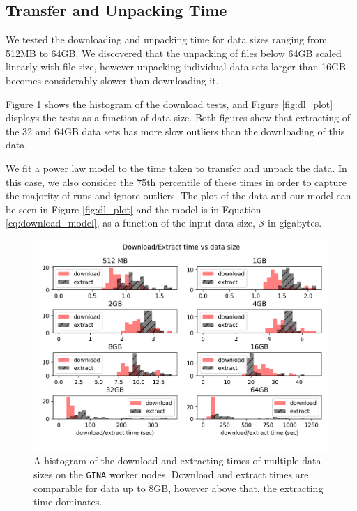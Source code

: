 \subsection{Transfer and Unpacking Time}\label{sec:results_dl}

We tested the downloading and unpacking time for data sizes ranging from 512MB to 64GB. We discovered that the unpacking of files below 64GB scaled linearly with file size, however unpacking individual data sets larger than 16GB becomes considerably slower than downloading it. 

Figure \ref{fig:dl_hist} shows the histogram of the download tests, and Figure \ref{fig:dl_plot} displays the tests as a function of data size. Both figures show that extracting of the 32 and 64GB data sets has more slow outliers than the downloading of this data. 

We fit a power law model to the time taken to transfer and unpack the data. In this case, we also consider the 75th percentile of these times in order to capture the majority of runs and ignore outliers. The plot of the data and our model can be seen in Figure \ref{fig:dl_plot} and the model is in Equation \ref{eq:download_model}, as a function of the input data size,
$\mathcal{S} $ in gigabytes.

\begin{figure}
    \includegraphics[width=0.95\linewidth]{figures/dl_ex_hatched.png}
      \caption{A histogram of the download and extracting times of multiple data sizes on the \texttt{GINA} worker nodes. Download and extract times are comparable for data up to 8GB, however above that, the extracting time dominates.  }
	\label{fig:dl_hist}
\end{figure}

